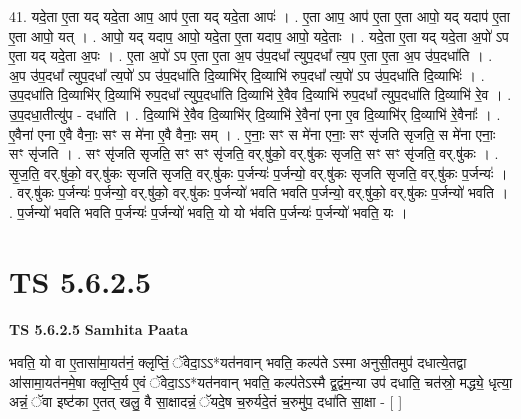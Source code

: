 \documentclass[17pt]{extarticle}
\begin{document}
41. यदे॒ता ए॒ता यद् यदे॒ता आप॒ आप॑ ए॒ता यद् यदे॒ता आपः॑ । . ए॒ता आप॒ आप॑ ए॒ता ए॒ता आपो॒ यद् यदाप॑ ए॒ता ए॒ता आपो॒ यत् । . आपो॒ यद् यदाप॒ आपो॒ यदे॒ता ए॒ता यदाप॒ आपो॒ यदे॒ताः । . यदे॒ता ए॒ता यद् यदे॒ता अ॒पो॑ ऽप ए॒ता यद् यदे॒ता अ॒पः । . ए॒ता अ॒पो॑ ऽप ए॒ता ए॒ता अ॒प उ॑प॒दधा᳚ त्युप॒दधा᳚ त्य॒प ए॒ता ए॒ता अ॒प उ॑प॒दधा॑ति । . अ॒प उ॑प॒दधा᳚ त्युप॒दधा᳚ त्य॒पो॑ ऽप उ॑प॒दधा॑ति दि॒व्याभि॑र् दि॒व्याभि॑ रुप॒दधा᳚ त्य॒पो॑ ऽप उ॑प॒दधा॑ति दि॒व्याभिः॑ । . उ॒प॒दधा॑ति दि॒व्याभि॑र् दि॒व्याभि॑ रुप॒दधा᳚ त्युप॒दधा॑ति दि॒व्याभि॑ रे॒वैव दि॒व्याभि॑ रुप॒दधा᳚ त्युप॒दधा॑ति दि॒व्याभि॑ रे॒व । . उ॒प॒दधा॒तीत्यु॑प - दधा॑ति । . दि॒व्याभि॑ रे॒वैव दि॒व्याभि॑र् दि॒व्याभि॑ रे॒वैना॑ एना ए॒व दि॒व्याभि॑र् दि॒व्याभि॑ रे॒वैनाः᳚ । . ए॒वैना॑ एना ए॒वै वैनाः॒ सꣳ स मे॑ना ए॒वै वैनाः॒ सम् । . ए॒नाः॒ सꣳ स मे॑ना एनाः॒ सꣳ सृ॑जति सृजति॒ स मे॑ना एनाः॒ सꣳ सृ॑जति । . सꣳ सृ॑जति सृजति॒ सꣳ सꣳ सृ॑जति॒ वर्.षु॑को॒ वर्.षु॑कः सृजति॒ सꣳ सꣳ सृ॑जति॒ वर्.षु॑कः । . सृ॒ज॒ति॒ वर्.षु॑को॒ वर्.षु॑कः सृजति सृजति॒ वर्.षु॑कः प॒र्जन्यः॑ प॒र्जन्यो॒ वर्.षु॑कः सृजति सृजति॒ वर्.षु॑कः प॒र्जन्यः॑ । . वर्.षु॑कः प॒र्जन्यः॑ प॒र्जन्यो॒ वर्.षु॑को॒ वर्.षु॑कः प॒र्जन्यो॑ भवति भवति प॒र्जन्यो॒ वर्.षु॑को॒ वर्.षु॑कः प॒र्जन्यो॑ भवति । . प॒र्जन्यो॑ भवति भवति प॒र्जन्यः॑ प॒र्जन्यो॑ भवति॒ यो यो भ॑वति प॒र्जन्यः॑ प॒र्जन्यो॑ भवति॒ यः । \newline
\pagebreak
{}

\section{ TS 5.6.2.5 }

\textbf{TS 5.6.2.5 } \newline
\textbf{Samhita Paata} \newline

भवति॒ यो वा ए॒तासा॑मा॒यत॑नं॒ क्लृप्तिं॒ ॅवेदा॒ऽऽ*यत॑नवान् भवति॒ कल्प॑ते ऽस्मा अनुसी॒तमुप॑ दधात्ये॒तद्वा आ॑सामा॒यत॑नमे॒षा क्लृप्ति॒र्य ए॒वं ॅवेदा॒ऽऽ*यत॑नवान् भवति॒ कल्प॑तेऽस्मै द्व॒द्वंम॒न्या उप॑ दधाति॒ चत॑स्रो॒ मद्ध्ये॒ धृत्या॒ अन्नं॒ ॅवा इष्ट॑का ए॒तत् खलु॒ वै सा॒क्षादन्नं॒ ॅयदे॒ष च॒रुर्यदे॒तं च॒रुमु॑प॒ दधा॑ति सा॒क्षा - [  ] \newline
\end{document}
